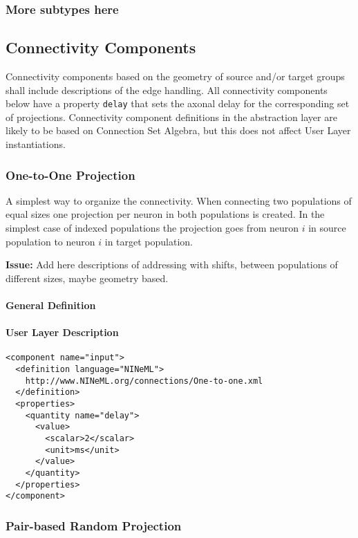 \documentclass{article}
\newcommand{\issue}[1]{%
\begin{center}
\colorbox{issuecolor}{\parbox{0.8\linewidth}{\textbf{Issue:} #1}}
\end{center}%
}
\begin{document}
\subsubsection{More subtypes here}

\subsection{Connectivity Components}

Connectivity components based on the geometry of source and/or target groups shall
include descriptions of the edge handling. All connectivity components below have
a property {\tt delay} that sets the axonal delay for the corresponding set
of projections. Connectivity component definitions in the abstraction layer are
likely to be based on Connection Set Algebra, but this does not affect
User Layer instantiations.

\subsubsection{One-to-One Projection}

A simplest way to organize the connectivity. When connecting two
populations of equal sizes one projection per neuron in both populations
is created. In the simplest case of indexed populations the projection
goes from neuron $i$ in source population to neuron $i$ in target
population.

\issue{Add here descriptions of addressing with shifts, between
populations of different sizes, maybe geometry based.}

\paragraph{General Definition}

\paragraph{User Layer Description}
\begin{verbatim}
<component name="input">
  <definition language="NINeML">
    http://www.NINeML.org/connections/One-to-one.xml
  </definition>
  <properties>
    <quantity name="delay">
      <value>
        <scalar>2</scalar>
        <unit>ms</unit>
      </value>
    </quantity>
  </properties>
</component>
\end{verbatim}

\subsubsection{Pair-based Random Projection}
\end{document}
